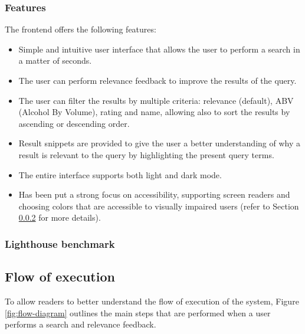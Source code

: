\subsubsection{Features}

The frontend offers the following features:

\begin{itemize}
  \item Simple and intuitive user interface that allows the user to perform a search in a matter of seconds.
  \item The user can perform relevance feedback to improve the results of the query.
  \item The user can filter the results by multiple criteria: relevance (default), ABV (Alcohol By Volume), rating and name, allowing also to sort the results by ascending or descending order.
  \item Result snippets are provided to give the user a better understanding of why a result is relevant to the query by highlighting the present query terms.
  \item The entire interface supports both light and dark mode.
  \item Has been put a strong focus on accessibility, supporting screen readers and choosing colors that are accessible to visually impaired users (refer to Section \ref{sec:lighthouse-benchmark} for more details).
\end{itemize}

\subsubsection{Lighthouse benchmark}
\label{sec:lighthouse-benchmark}

\newpage
\subsection{Flow of execution}

To allow readers to better understand the flow of execution of the system, Figure \ref{fig:flow-diagram} outlines the main steps that are performed when a user performs a search and relevance feedback.

